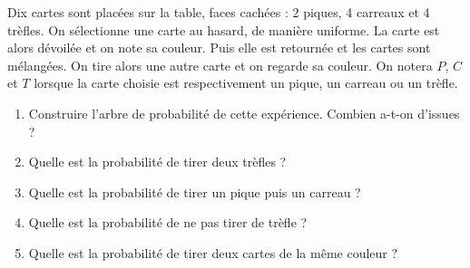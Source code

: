 \documentclass[11pt,fleqn, openany]{book} %
\begin{document}
\begin{exercise}Dix cartes sont placées sur la table, faces cachées : 2 piques, 4 carreaux et 4 trèfles. On sélectionne une carte au hasard, de manière uniforme. La carte est alors dévoilée et on note sa couleur. Puis elle est retournée et les cartes sont mélangées. On tire alors une autre carte et on regarde sa couleur. On notera $P$, $C$ et $T$ lorsque la carte choisie est respectivement un pique, un carreau ou un trèfle.
\begin{enumerate}
\item Construire l'arbre de probabilité de cette expérience. Combien a-t-on d'issues ?
\item Quelle est la probabilité de tirer deux trèfles ?
\item Quelle est la probabilité de tirer un pique puis un carreau ?
\item Quelle est la probabilité de ne pas tirer de trèfle ?
\item Quelle est la probabilité de tirer deux cartes de la même couleur ?
\end{enumerate}\end{exercise}
\end{document}
